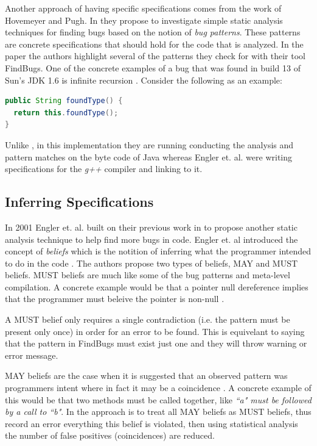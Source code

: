 \documentclass[10pt,oneside]{IEEEtran}
\begin{document}
Another approach of having specific specifications comes from the work of Hovemeyer and Pugh. In \cite{6} they propose to investigate simple static analysis techniques for finding bugs based on the notion of \textit{bug patterns}. These patterns are concrete specifications that should hold for the code that is analyzed. In the paper the authors highlight several of the patterns they check for with their tool FindBugs. One of the concrete examples of a bug that was found in build 13 of Sun's JDK 1.6 is infinite recursion \cite{8}. Consider the following as an example:
\begin{lstlisting}[language=Java]
public String foundType() {
  return this.foundType();
}
\end{lstlisting}

Unlike \cite{5}, in this implementation they are running conducting the analysis and pattern matches on the byte code of Java whereas Engler et. al. were writing specifications for the \textit{g++} compiler and linking to it.
\subsection{Inferring Specifications}
In 2001 Engler et. al. built on their previous work in \cite{5} to propose another static analysis technique to help find more bugs in code. Engler et. al introduced the concept of \textit{beliefs} which is the notition of inferring what the programmer intended to do in the code \cite{7}. The authors propose two types of beliefs, MAY and MUST beliefs. MUST beliefs are much like some of the bug patterns and meta-level compilation. A concrete example would be that a pointer null dereference implies that the programmer must beleive the pointer is non-null \cite{7}.

A MUST belief only requires a single contradiction (i.e. the pattern must be present only once) in order for an error to be found. This is equivelant to saying that the pattern in FindBugs must exist just one and they will throw warning or error message.

MAY beliefs are the case when it is suggested that an observed pattern was programmers intent where in fact it may be a coincidence \cite{7}. A concrete example of this would be that two methods must be called together, like \textit{``a" must be followed by a call to ``b"}. In \cite{7} the approach is to treat all MAY beliefs as MUST beliefs, thus record an error everything this belief is violated, then using statistical analysis the number of false positives (coincidences) are reduced.
\end{document}
